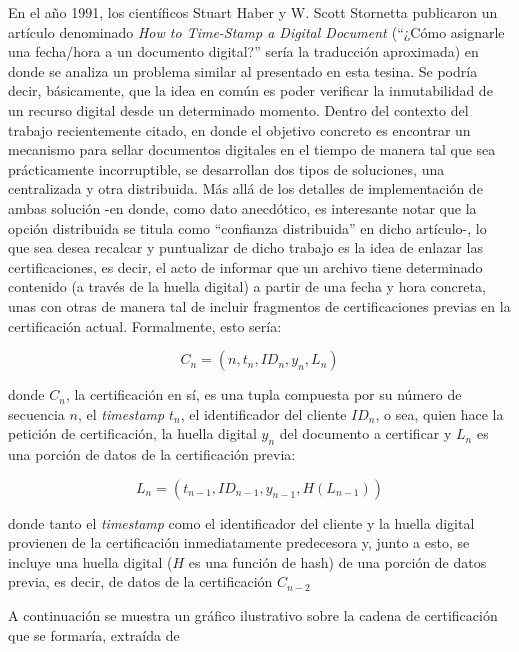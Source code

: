 En el año 1991, los científicos Stuart Haber y W. Scott Stornetta publicaron un artículo denominado \textit{How to Time-Stamp a Digital Document \cite{Haber:1991:TDD:2724969.2725089}} (``¿Cómo asignarle una fecha/hora a un documento digital?'' sería la traducción aproximada) en donde se analiza un problema similar al presentado en esta tesina. Se podría decir, básicamente, que la idea en común es poder verificar la inmutabilidad de un recurso digital desde un determinado momento. Dentro del contexto del trabajo recientemente citado, en donde el objetivo concreto es encontrar un mecanismo para sellar documentos digitales en el tiempo de manera tal que sea prácticamente incorruptible, se desarrollan dos tipos de soluciones, una centralizada y otra distribuida. Más allá de los detalles de implementación de ambas solución -en donde, como dato anecdótico, es interesante notar que la opción distribuida se titula como ``confianza distribuida'' en dicho artículo-, lo que sea desea recalcar y puntualizar de dicho trabajo es la idea de enlazar las certificaciones, es decir, el acto de informar que un archivo tiene determinado contenido (a través de la huella digital) a partir de una fecha y hora concreta, unas con otras de manera tal de incluir fragmentos de certificaciones previas en la certificación actual. Formalmente, esto sería:

\begin{equation}
  C_n = (n, t_n, ID_n, y_n, L_n)
\end{equation}

donde $C_n$, la certificación en sí, es una tupla compuesta por su número de secuencia $n$, el \textit{timestamp} $t_n$, el identificador del cliente $ID_n$, o sea, quien hace la petición de certificación, la huella digital $y_n$ del documento a certificar y $L_n$ es una porción de datos de la certificación previa:

\begin{equation}
  L_n = (t_{n-1}, ID_{n-1}, y_{n-1}, H(L_{n-1}))
\end{equation}

donde tanto el \textit{timestamp} como el identificador del cliente y la huella digital provienen de la certificación inmediatamente predecesora y, junto a esto, se incluye una huella digital ($H$ es una función de hash) de una porción de datos previa, es decir, de datos de la certificación $C_{n-2}$

A continuación se muestra un gráfico ilustrativo sobre la cadena de certificación que se formaría, extraída de \cite{Narayanan:2016:BCT:2994437}

